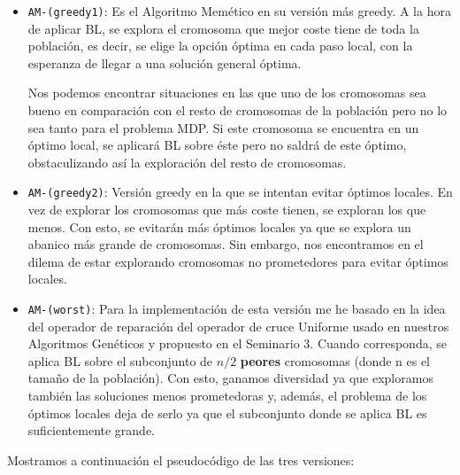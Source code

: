 \begin{itemize}
	\item \texttt{AM-(greedy1)}: Es el Algoritmo Memético en su versión más greedy. A la hora de aplicar BL, se explora el cromosoma que mejor coste tiene de toda la población, es decir, se elige la opción óptima en cada paso local, con la esperanza de llegar a una solución general óptima. 
	
	
	Nos podemos encontrar situaciones en las que uno de los cromosomas sea bueno en comparación con el resto de cromosomas de la población pero no lo sea tanto para el problema MDP. Si este cromosoma se encuentra en un óptimo local, se aplicará BL sobre éste pero no saldrá de este óptimo, obstaculizando así la exploración del resto de cromosomas.

	
	
	\item \texttt{AM-(greedy2)}: Versión greedy en la que se intentan evitar óptimos locales. En vez de explorar los cromosomas que más coste tienen, se exploran los que menos. Con esto, se evitarán más óptimos locales ya que se explora un abanico más grande de cromosomas.
	Sin embargo, nos encontramos en el dilema de estar explorando cromosomas no prometedores para evitar óptimos locales.
	
	\item \texttt{AM-(worst)}: Para la implementación de esta versión me he basado en la idea del operador de reparación del operador de cruce Uniforme usado en nuestros Algoritmos Genéticos y propuesto en el Seminario 3. Cuando corresponda, se aplica BL sobre el subconjunto de $n/2$ \textbf{peores} cromosomas (donde n es el tamaño de la población). Con esto, ganamos diversidad ya que exploramos también las soluciones menos prometedoras y, además, el problema de los óptimos locales deja de serlo ya que el subconjunto donde se aplica BL es suficientemente grande.
	
\end{itemize}








\newpage

Mostramos a continuación el pseudocódigo de las tres versiones:





